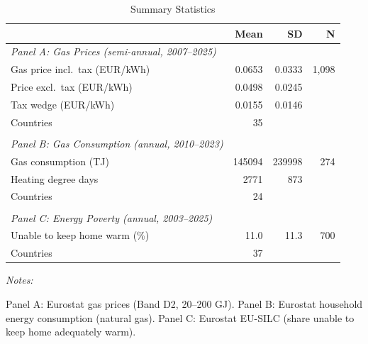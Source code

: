 \begin{table}[!h]
\centering
\caption{Summary Statistics\label{tab:summary}}
\centering
\begin{threeparttable}
\begin{tabular}[t]{lrrr}
\toprule
 & Mean & SD & N\\
\midrule
\textit{Panel A: Gas Prices (semi-annual, 2007--2025)} &  &  & \\
\quad Gas price incl.\ tax (EUR/kWh) & 0.0653 & 0.0333 & 1,098\\
\quad Price excl.\ tax (EUR/kWh) & 0.0498 & 0.0245 & \\
\quad Tax wedge (EUR/kWh) & 0.0155 & 0.0146 & \\
\quad Countries & 35 &  & \\
\addlinespace
 &  &  & \\
\textit{Panel B: Gas Consumption (annual, 2010--2023)} &  &  & \\
\quad Gas consumption (TJ) & 145094 & 239998 & 274\\
\quad Heating degree days & 2771 & 873 & \\
\quad Countries & 24 &  & \\
\addlinespace
 &  &  & \\
\textit{Panel C: Energy Poverty (annual, 2003--2025)} &  &  & \\
\quad Unable to keep home warm (\%) & 11.0 & 11.3 & 700\\
\quad Countries & 37 &  & \\
\bottomrule
\end{tabular}
\begin{tablenotes}
\item \textit{Notes:} 
\item Panel A: Eurostat gas prices (Band D2, 20--200 GJ). Panel B: Eurostat household energy consumption (natural gas). Panel C: Eurostat EU-SILC (share unable to keep home adequately warm).
\end{tablenotes}
\end{threeparttable}
\end{table}
